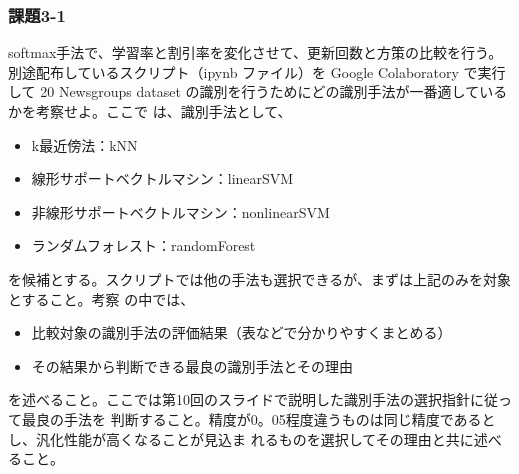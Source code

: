 \subsubsection{課題3-1}
softmax手法で、学習率と割引率を変化させて、更新回数と方策の比較を行う。別途配布しているスクリプト（ipynb ファイル）を Google Colaboratory で実行して 20
Newsgroups dataset の識別を行うためにどの識別手法が一番適しているかを考察せよ。ここで
は、識別手法として、
\begin{itemize}
  \item k最近傍法：kNN
  \item 線形サポートベクトルマシン：linearSVM
  \item 非線形サポートベクトルマシン：nonlinearSVM
  \item ランダムフォレスト：randomForest
\end{itemize}
を候補とする。スクリプトでは他の手法も選択できるが、まずは上記のみを対象とすること。考察
の中では、
\begin{itemize}
  \item 比較対象の識別手法の評価結果（表などで分かりやすくまとめる）
  \item その結果から判断できる最良の識別手法とその理由
\end{itemize}
を述べること。ここでは第10回のスライドで説明した識別手法の選択指針に従って最良の手法を
判断すること。精度が0。05程度違うものは同じ精度であるとし、汎化性能が高くなることが見込ま
れるものを選択してその理由と共に述べること。
